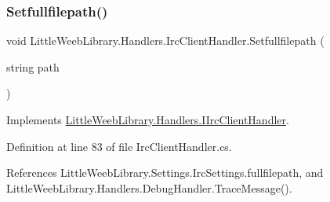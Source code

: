 \subsubsection{\texorpdfstring{Setfullfilepath()}{Setfullfilepath()}}
{\footnotesize\ttfamily void Little\+Weeb\+Library.\+Handlers.\+Irc\+Client\+Handler.\+Setfullfilepath (\begin{DoxyParamCaption}\item[{string}]{path }\end{DoxyParamCaption})}



Implements \mbox{\hyperlink{interface_little_weeb_library_1_1_handlers_1_1_i_irc_client_handler_a060949c5d049dd8a06c0ef672b4d4fad}{Little\+Weeb\+Library.\+Handlers.\+I\+Irc\+Client\+Handler}}.



Definition at line 83 of file Irc\+Client\+Handler.\+cs.



References Little\+Weeb\+Library.\+Settings.\+Irc\+Settings.\+fullfilepath, and Little\+Weeb\+Library.\+Handlers.\+Debug\+Handler.\+Trace\+Message().


